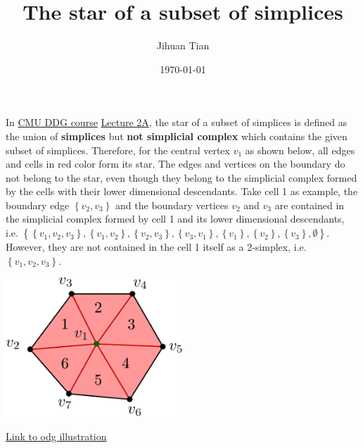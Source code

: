 \documentclass[11pt]{article}
\author{Jihuan Tian}
\date{\today}
\title{The star of a subset of simplices}
\begin{document}
\maketitle
\setcounter{tocdepth}{5}
\tableofcontents

In \href{https://www.youtube.com/playlist?list=PL9\_jI1bdZmz0hIrNCMQW1YmZysAiIYSSS}{CMU DDG course} \href{https://youtu.be/TDic3pJyYb8?list=PL9\_jI1bdZmz0hIrNCMQW1YmZysAiIYSSS\&t=2547}{Lecture 2A}, the star of a subset of simplices is defined as the union of \textbf{simplices} but \textbf{not simplicial complex} which contains the given subset of simplices. Therefore, for the central vertex \(v_1\) as shown below, all edges and cells in red color form its star. The edges and vertices on the boundary do not belong to the star, even though they belong to the simplicial complex formed by the cells with their lower dimensional descendants. Take cell 1 as example, the boundary edge \(\left\{ v_2, v_3 \right\}\) and the boundary vertices \(v_2\) and \(v_3\) are contained in the simplicial complex formed by cell 1 and its lower dimensional descendants, i.e. \(\left\{ \left\{ v_1,v_2,v_3 \right\}, \left\{ v_1,v_2 \right\}, \left\{ v_2,v_3 \right\}, \left\{ v_3,v_1 \right\}, \left\{ v_1 \right\}, \left\{ v_2 \right\}, \left\{ v_3 \right\}, \emptyset \right\}\). However, they are not contained in the cell 1 itself as a 2-simplex, i.e. \(\left\{ v_1,v_2,v_3 \right\}\).
\begin{center}
\includegraphics[width=0.5\textwidth]{figures/2023-07-03-star-of-simplices.png}
\end{center}
\href{../../../academic/math/docs/schematics/2023-07-03-star-of-simplices.odg}{Link to odg illustration}
\end{document}
